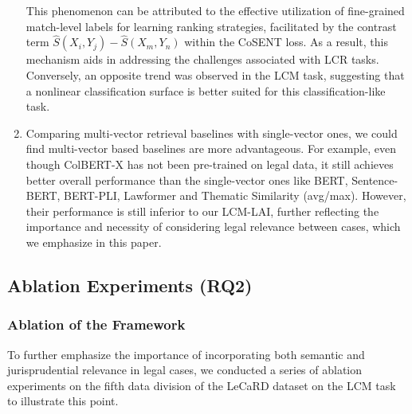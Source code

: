 \begin{enumerate}
{    This phenomenon can be attributed to the effective utilization of fine-grained match-level labels for learning ranking strategies, facilitated by the contrast term $\hat{S}(X_{i}, Y_{j})- \hat{S}(X_{m}, Y_{n})$ within the CoSENT loss.
    As a result, this mechanism aids in addressing the challenges associated with LCR tasks.
    Conversely, an opposite trend was observed in the LCM task, suggesting that a nonlinear classification surface is better suited for this classification-like task.
    }
    \item {
    Comparing multi-vector retrieval baselines with single-vector ones, we could find multi-vector based baselines are more advantageous. For example, even though ColBERT-X has not been pre-trained on legal data, it still achieves better overall performance than the single-vector ones like BERT, Sentence-BERT, BERT-PLI, Lawformer and Thematic Similarity (avg/max).
    However, their performance is still inferior to our LCM-LAI, further reflecting the importance and necessity of considering legal relevance between cases, which we emphasize in this paper.
    }
\end{enumerate}

\subsection{Ablation Experiments (RQ2)}
\subsubsection{\textbf{Ablation of the Framework}}
To further emphasize the importance of incorporating both semantic and jurisprudential relevance in legal cases, we conducted a series of ablation experiments on the fifth data division of the LeCaRD dataset on the LCM task to illustrate this point.


